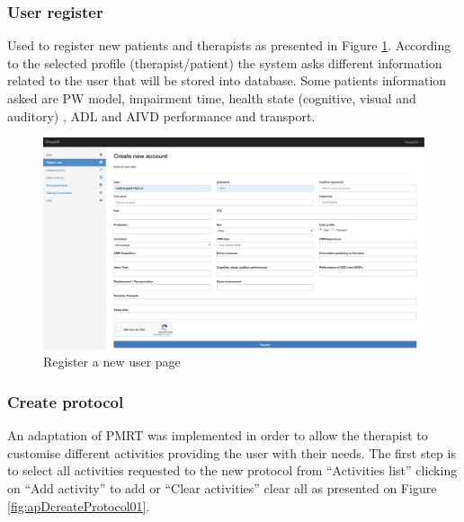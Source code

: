 \subsubsection{User register}

Used to register new patients and therapists as presented in Figure \ref{fig:apDtUserRegister}. According to the selected profile (therapist/patient) the system asks different information related to the user that will be stored into database. Some patients information asked are PW model, impairment time, health state (cognitive, visual and auditory) , ADL and AIVD performance and transport.

\begin{figure}[!hbt]
\begin{center}
\includegraphics[width=0.95\linewidth]{img/apendiceD/tUserRegister}
\caption{Register a new user page} \label{fig:apDtUserRegister}
\end{center}
\vspace{-20pt}
\end{figure}

\subsubsection{Create protocol}
\label{sec:appCreateProcotol}

An adaptation of PMRT was implemented in order to allow the therapist to customise different  activities providing the user with their needs. The first step is to select all activities requested to the new protocol from ``Activities list'' clicking on ``Add activity'' to add or ``Clear activities'' clear all as presented on Figure \ref{fig:apDcreateProtocol01}. 

